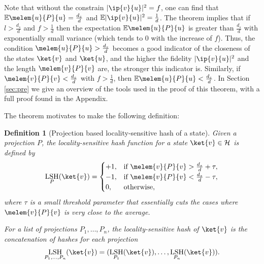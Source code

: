 \documentclass[pra,twocolumn,superscriptaddress,longbibliography]{revtex4-2}
\newtheorem{definition}{Definition}
\theoremstyle{remark}
\newcommand{\mcl}{\mathcal}
\newcommand{\mbb}{\mathbb}
\DeclareMathOperator{\lsh}{LSH}
\numberwithin{equation}{section}
\begin{document}
Note that without the constrain $|\ip{v}{u}|^2 = f$, one can find that ${\mbb{E}} \melem{u}{P}{u} = \frac{d_s}{d}$ and 
${\mbb{E}} |\ip{v}{u}|^2 = \frac{1}{d}$. The theorem implies that if $l > \frac{d_s}{d}$ and $f > \frac{1}{d}$ then 
the expectation ${\mbb{E}} \melem{u}{P}{u}$ is greater than $\frac{d_s}{d}$ with exponentially small variance 
(which tends to $0$ with the increase of $f$). 
Thus, the condition $\melem{u}{P}{u} > \frac{d_s}{d}$ becomes a good indicator of the closeness of the states $\ket{v}$ and $\ket{u}$,
and the higher the fidelity $|\ip{v}{u}|^2$ and the length $\melem{v}{P}{v}$ are, the stronger this indicator is. 
Similarly, if $\melem{v}{P}{v} < \frac{d_s}{d}$ with $f > \frac{1}{d}$, then ${\mbb{E}} \melem{u}{P}{u} < \frac{d_s}{d}$. 
In Section \ref{sec:pre} we give an overview of the tools used in the proof of this theorem, with a full proof found in the Appendix. %

The theorem motivates to make the following definition: 
\begin{definition}[Projection based locality-sensitive hash of a state]\label{def:lsh}
Given a projection $P$, the locality-sensitive hash function for a state $\ket{v} \in \mcl{H}$ is defined by
\begin{align}
\lsh_P(\ket{v}) = \begin{cases}
+1, & \text{if } \melem{v}{P}{v} > \frac{d_s}{d} + \tau, \\
-1, & \text{if } \melem{v}{P}{v} < \frac{d_s}{d} - \tau, \\
0, & \text{otherwise},
\end{cases}
\end{align}
where $\tau$ is a small threshold parameter that essentially cuts the cases where $\melem{v}{P}{v}$ is very close to the average.

For a list of projections $P_1,\dots,P_n$, the locality-sensitive hash of $\ket{v}$ is the concatenation of hashes for each projection
\begin{align}
\lsh_{P_1,\dots,P_n}(\ket{v}) = (\lsh_{P_1}(\ket{v}),\dots,\lsh_{P_n}(\ket{v})).
\end{align}
\end{definition}
\end{document}
